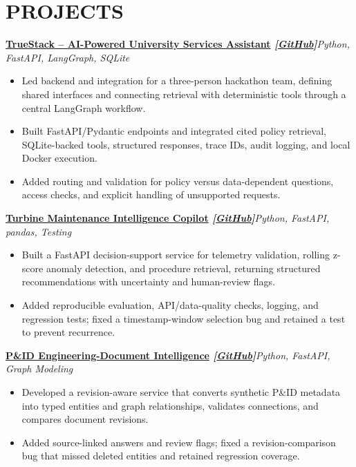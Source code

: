 \documentclass[10pt,a4paper]{article}
\newcommand{\resumeProject}[2]{%
  \textbf{#1}\hfill{\small\textit{#2}}\vspace{-3pt}
}
\begin{document}
\section*{PROJECTS}
\resumeProject
  {\href{https://nothing0g.github.io/analyst/projects/truestack-ai-assistant/}{TrueStack -- AI-Powered University Services Assistant}
  \hspace{3pt}\textnormal{\textit{[\href{https://github.com/Nothing0g/TrueStack_HCLTech_aiHackathon}{GitHub}]}}}
  {Python, FastAPI, LangGraph, SQLite}
\begin{itemize}
  \item Led backend and integration for a three-person hackathon team, defining shared interfaces and connecting retrieval with deterministic tools through a central LangGraph workflow.
  \item Built FastAPI/Pydantic endpoints and integrated cited policy retrieval, SQLite-backed tools, structured responses, trace IDs, audit logging, and local Docker execution.
  \item Added routing and validation for policy versus data-dependent questions, access checks, and explicit handling of unsupported requests.
\end{itemize}

\resumeProject
  {\href{https://nothing0g.github.io/analyst/projects/turbine-maintenance-copilot/}{Turbine Maintenance Intelligence Copilot}
  \hspace{3pt}\textnormal{\textit{[\href{https://github.com/Nothing0g/turbine-maintenance-copilot}{GitHub}]}}}
  {Python, FastAPI, pandas, Testing}
\begin{itemize}
  \item Built a FastAPI decision-support service for telemetry validation, rolling z-score anomaly detection, and procedure retrieval, returning structured recommendations with uncertainty and human-review flags.
  \item Added reproducible evaluation, API/data-quality checks, logging, and regression tests; fixed a timestamp-window selection bug and retained a test to prevent recurrence.
\end{itemize}

\resumeProject
  {\href{https://nothing0g.github.io/analyst/projects/pid-engineering-document-intelligence/}{P\&ID Engineering-Document Intelligence}
  \hspace{3pt}\textnormal{\textit{[\href{https://github.com/Nothing0g/pid-engineering-document-intelligence}{GitHub}]}}}
  {Python, FastAPI, Graph Modeling}
\begin{itemize}
  \item Developed a revision-aware service that converts synthetic P\&ID metadata into typed entities and graph relationships, validates connections, and compares document revisions.
  \item Added source-linked answers and review flags; fixed a revision-comparison bug that missed deleted entities and retained regression coverage.
\end{itemize}
\end{document}
